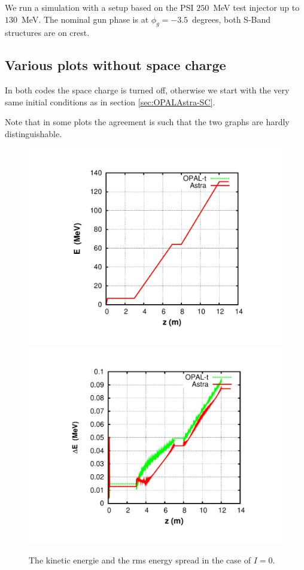 \documentclass{psi-note}    %
\begin{document}
We run a simulation with a setup based on the PSI $250$~MeV test injector up
to $130$~MeV. The nominal gun phase is at $\phi_g = -3.5$~degrees, both S-Band
structures are on crest.


\subsection{Various plots without space charge}  \label{sec:OPALAstra-noSC}
In both codes the space charge is turned off, otherwise we start with the very same initial conditions
as in section \ref{sec:OPALAstra-SC}.

Note that in some plots the agreement is such that the two
graphs are hardly distinguishable. 
\begin{figure}[htbp]
\begin{center}
\includegraphics[width=.49\linewidth,angle=0]{figures/opal-astra-nosc-energy-1}
\includegraphics[width=.49\linewidth,angle=0]{figures/opal-astra-nosc-de-1}
\caption{The kinetic energie and the rms energy spread in the case of $I=0$. }
\label{fig:opal-astra-nosc-energy-1}
\end{center}
\end{figure}
\end{document}
